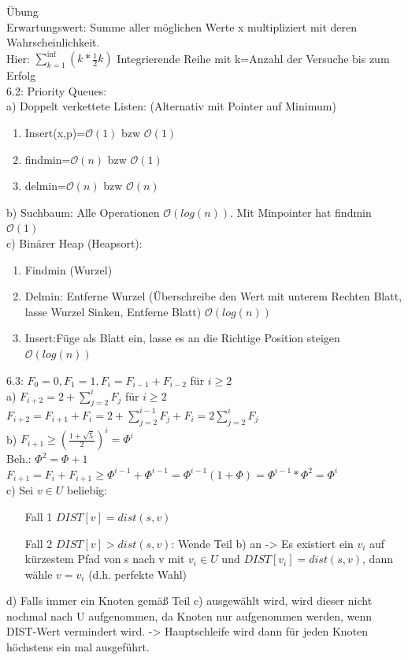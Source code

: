 \documentclass[a4paper]{article}
\newcommand{\oh}[1]{$\mathcal{O}(#1)$}
\begin{document}
Übung\\
Erwartungswert: Summe aller möglichen Werte x multipliziert mit deren Wahrscheinlichkeit.\\
Hier: $\sum_{k=1}^{\inf}(k*\frac{1}{2}k)$ Integrierende Reihe mit k=Anzahl der Versuche bis zum Erfolg\\
6.2: Priority Queues:\\
a) Doppelt verkettete Listen: (Alternativ mit Pointer auf Minimum)\begin{enumerate}
\item Insert(x,p)=\oh{1} bzw \oh{1}
\item findmin=\oh{n} bzw \oh{1}
\item delmin=\oh{n} bzw \oh{n}
\end{enumerate}
b) Suchbaum: Alle Operationen \oh{log(n)}. Mit Minpointer hat findmin \oh{1}\\
c) Binärer Heap (Heapsort): \begin{enumerate}
\item Findmin (Wurzel)
\item Delmin: Entferne Wurzel (Überschreibe den Wert mit unterem Rechten Blatt, lasse Wurzel Sinken, Entferne Blatt) \oh{log(n)}
\item Insert:Füge als Blatt ein, lasse es an die Richtige Position steigen \oh{log(n)}
\end{enumerate}	
6.3: $F_0=0,F_1=1,F_i=F_{i-1}+F_{i-2}$ für $i\geq 2$\\
a) $F_{i+2} = 2 + \sum_{j=2}^i F_j$ für $i\geq 2$\\
$F_{i+2} =  F_{i+1} +F_i = 2+\sum_{j=2}^{i-1} F_j + F_i = 2 \sum_{j=2}^i F_j$\\
b) $F_{i+1} \geq (\frac{1+\sqrt{5}}{2})^i=\Phi^i$\\
Beh.: $\Phi^2 = \Phi+1$\\
$F_{i+1} = F_i + F_{i+1} \geq \Phi^{i-1}+\Phi^{i-1}=\Phi^{i-1}(1+\Phi)=\Phi^{i-1}*\Phi^2 = \Phi^i$\\
c) Sei $v\in U$ beliebig:\\
\begin{itemize}
\item[Fall 1] $DIST[v]=dist(s,v)$ 
\item[Fall 2] $DIST[v]>dist(s,v)$: Wende Teil b) an -> Es existiert ein $v_i$ auf kürzestem Pfad von s nach v mit $v_i\in U$ und $DIST[v_i]=dist(s,v)$, dann wähle $v=v_i$ (d.h. perfekte Wahl)
\end{itemize}
d) Falls immer ein Knoten gemäß Teil c) ausgewählt wird, wird dieser nicht nochmal nach U aufgenommen, da Knoten nur aufgenommen werden, wenn DIST-Wert vermindert wird. -> Hauptschleife wird dann für jeden Knoten höchstens ein mal ausgeführt.\\
\end{document}
